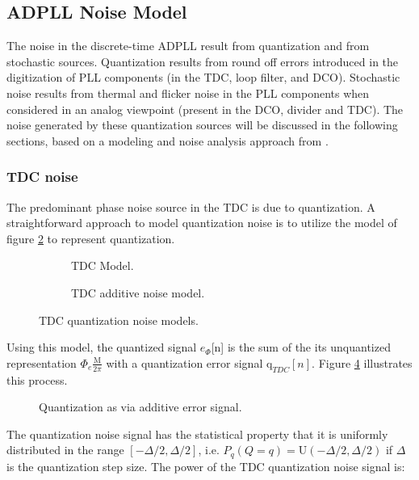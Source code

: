 \subsection{ADPLL Noise Model} \label{pn_theory}
The noise in the discrete-time ADPLL result from quantization and from stochastic sources. Quantization results from round off errors introduced in the digitization of PLL components (in the TDC, loop filter, and DCO). Stochastic noise results from thermal and flicker noise in the PLL components when considered in an analog viewpoint (present in the DCO, divider and TDC). The noise generated by these quantization sources will be discussed in the following sections, based on a modeling and noise analysis approach from \cite{perrott_2002}.

\subsubsection{TDC noise}\label{tdc_noise}
	The predominant phase noise source in the TDC is due to quantization. A straightforward approach to model quantization noise is to utilize the model of figure \ref{fig:tdc_add_pn} to represent quantization.
	\begin{figure}[htb!]
	    \centering
	    \begin{subfigure}{0.5\textwidth}
	        \centering
	        
	        \caption{TDC Model.}
	        \label{fig:tdc1}
	    \end{subfigure}%
	    \begin{subfigure}{0.5\textwidth}
	        \centering
	        
	        \caption{TDC additive noise model.}
	        \label{fig:tdc_add_pn}
	    \end{subfigure}
	    \label{fig:tdc_pn_model}
	    \caption{TDC quantization noise models.}
	\end{figure}
	\FloatBarrier
	Using this model, the quantized signal $e_\Phi$[n] is the sum of the its unquantized representation $\Phi_e\frac{\mathrm{M}}{2\pi}$ with a quantization error signal $\mathrm{q}_{TDC}[n]$. Figure \ref{fig:quantization} illustrates this process.
	\begin{figure}[htb!]
		\center
		\caption{Quantization as via additive error signal.}
		\label{fig:quantization}
	\end{figure}
	\FloatBarrier
	The quantization noise signal has the statistical property that it is uniformly distributed in the range $[-\Delta/2, \Delta/2]$, i.e. $P_q(Q=q) =\mathrm{U}(-\Delta/2, \Delta/2)$ if $\Delta$ is the quantization step size. The power of the TDC quantization noise signal is:
